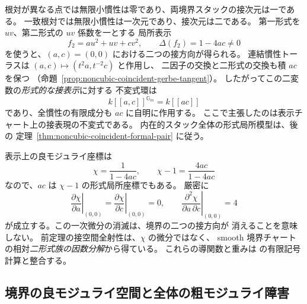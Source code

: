 \begin{remark}[一致根対の二つの接方向と良モジュライの局所不変式]
\label{rem:noncubic-coincident-chi-tangent-loss}
根対が異なる点では無限小慣性は零であり、両境界スタックの接次元は一である。
一致根対では無限小慣性は一次元であり、接次元は二である。
第一形式を $uv$、第二形式の $uv$ 係数を一とする
局所表示
\[
 f_2=a u^2+uv+c v^2,\qquad \Delta(f_2)=1-4ac\ne0
\]
を使うと、$(a,c)=(0,0)$ における二つの接方向が得られる。
連結慣性トーラスは
$(a,c)\mapsto(t^2a,t^{-2}c)$ と作用し、
二因子の交換と二形式の交換も積 $ac$ を保つ
（命題~\ref{prop:noncubic-coincident-gerbe-tangent}）。
したがってこの二変数の\emph{形式的な接表示}に対する
不変式環は
\[
 k[[a,c]]^{\mathbb G_m}=k[[ac]]
\]
であり、全慣性の有限成分も $ac$ に自明に作用する。
ここで主張したのは表示チャート上の接表現の不変式である。
内在的スタック全体の形式局所模型は、後の
定理~\ref{thm:noncubic-coincident-formal-pair} に従う。

表示上の良モジュライ座標は
\[
 \chi=\frac1{1-4ac},\qquad
 \chi-1=\frac{4ac}{1-4ac}
\]
なので、$ac$ は $\chi-1$ の形式局所座標でもある。
厳密に
\[
 \left.\frac{\partial\chi}{\partial a}\right|_{(0,0)}
 =\left.\frac{\partial\chi}{\partial c}\right|_{(0,0)}=0,
 \qquad
 \left.\frac{\partial^2\chi}{\partial a\,\partial c}
 \right|_{(0,0)}=4
\]
が成立する。この一次微分の消滅は、境界の二つの接方向が
消えることを意味しない。
前定理の接空間全射性は、$\chi$ の微分ではなく、
smooth 境界チャートの相対\emph{二形式族の因数分解}から得ている。
これらの導関数と重みは
 の有限記号計算と整合する。
\end{remark}

\subsection{境界の良モジュライ空間と全体の粗モジュライ障害}

